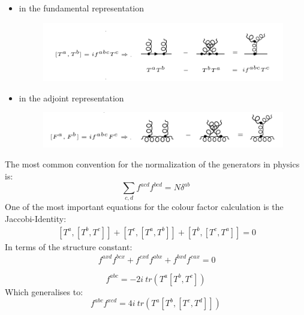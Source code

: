 \begin{itemize}
\item in the fundamental representation
\begin{figure}[h!]
\centering
\includegraphics[scale=0.6]{images/Intro/Casimir.png}
\end{figure}
\item in the adjoint representation\\
\begin{figure}[h!]
\centering
\includegraphics[scale=0.6]{images/Intro/CasimirAdj.png}
\end{figure}
\end{itemize}
\pagebreak
The most common convention for the normalization of the generators in physics is:
\begin{equation}
\displaystyle\sum\limits_{c,d} f^{acd} f^{bcd} = N \delta^{ab}
\end{equation}
One of the most important equations for the colour factor calculation is the Jaccobi-Identity:
\begin{equation}
\begin{split}\:
[T^a, [T^b , T^c]]+[T^c, [T^a , T^b]]+[T^b, [T^c , T^a]]=0
\end{split}
\end{equation}
In terms of the structure constant:
\begin{equation}
\begin{split}\:
f^{axd} f^{bcx} +  f^{cxd} f^{abx} +f^{bxd} f^{cax} =0
\end{split}
\end{equation}

\begin{equation}
f^{abc} = -2i\: tr(T^a[T^b, T^c])
\end{equation}
Which generalises to:
\begin{equation}
f^{abc}f^{xcd} = 4i\: tr(T^a[T^b, [T^c, T^d]])
\end{equation}


